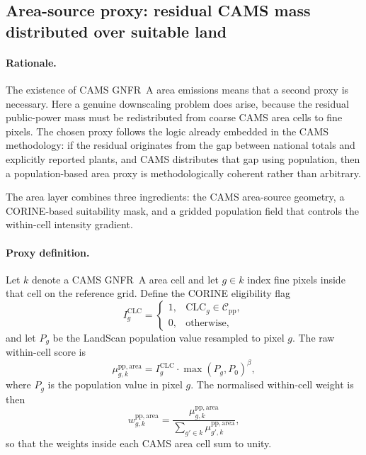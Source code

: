 \subsection{Area-source proxy: residual CAMS mass distributed over suitable land}

\paragraph{Rationale.}
The existence of CAMS GNFR~A area emissions means that a second proxy is
necessary. Here a genuine downscaling problem does arise, because the residual
public-power mass must be redistributed from coarse CAMS area cells to fine
pixels. The chosen proxy follows the logic already embedded in the CAMS
methodology: if the residual originates from the gap between national totals
and explicitly reported plants, and CAMS distributes that gap using
population, then a population-based area proxy is methodologically coherent
rather than arbitrary.

The area layer combines three ingredients: the CAMS area-source geometry, a
CORINE-based suitability mask, and a gridded population field that controls
the within-cell intensity gradient.

\paragraph{Proxy definition.}
Let $k$ denote a CAMS GNFR~A area cell and let $g \in k$ index fine pixels
inside that cell on the reference grid. Define the CORINE eligibility flag
\begin{equation}
  I_g^{\mathrm{CLC}} =
  \begin{cases}
    1, & \mathrm{CLC}_g \in \mathcal{C}_{\mathrm{pp}},\\
    0, & \text{otherwise},
  \end{cases}
\end{equation}
and let $P_g$ be the LandScan population value resampled to pixel $g$. The raw
within-cell score is
\begin{equation}
  \mu_{g,k}^{\mathrm{pp,area}} =
  I_g^{\mathrm{CLC}} \cdot \max(P_g, P_0)^{\beta},
\end{equation}
where $P_g$ is the population value in pixel $g$. The
normalised within-cell weight is then
\begin{equation}
  w_{g,k}^{\mathrm{pp,area}} =
  \frac{\mu_{g,k}^{\mathrm{pp,area}}}
       {\displaystyle\sum_{g' \in k} \mu_{g',k}^{\mathrm{pp,area}}},
\end{equation}
so that the weights inside each CAMS area cell sum to unity.

